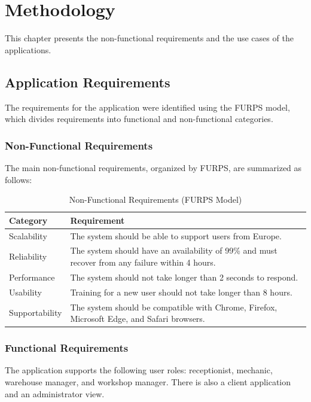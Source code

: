 \chapter{Methodology}%
\label{chapter:methodology}

\begin{introduction}
This chapter presents the non-functional requirements and the use cases of the applications. 
\end{introduction} 




\section{Application Requirements}
The requirements for the application were identified using the FURPS model, which divides requirements into functional and non-functional categories.

\subsection{Non-Functional Requirements}
The main non-functional requirements, organized by FURPS, are summarized as follows:

\begin{table}[htbp]
\centering
\begin{tabular}{|l|p{10cm}|}
\hline
\textbf{Category} & \textbf{Requirement} \\ \hline
Scalability & The system should be able to support users from Europe. \\ \hline
Reliability & The system should have an availability of 99\% and must recover from any failure within 4 hours. \\ \hline
Performance & The system should not take longer than 2 seconds to respond. \\ \hline
Usability & Training for a new user should not take longer than 8 hours. \\ \hline
Supportability & The system should be compatible with Chrome, Firefox, Microsoft Edge, and Safari browsers. \\ \hline
\end{tabular}
\caption{Non-Functional Requirements (FURPS Model)}
\end{table}

\subsection{Functional Requirements}
The application supports the following user roles: receptionist, mechanic, warehouse manager, and workshop manager. There is also a client application and an administrator view.

